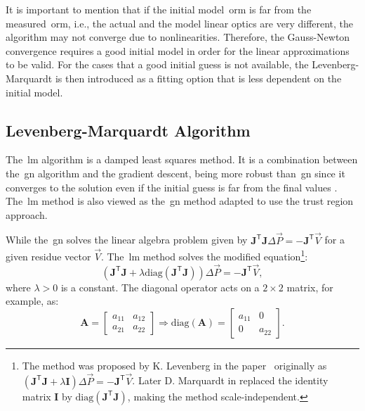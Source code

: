 It is important to mention that if the initial model~\gls{orm} is far from the measured~\gls{orm}, i.e., the actual and the model linear optics are very different, the algorithm may not converge due to nonlinearities. Therefore, the Gauss-Newton convergence requires a good initial model in order for the linear approximations to be valid. For the cases that a good initial guess is not available, the Levenberg-Marquardt is then introduced as a fitting option that is less dependent on the initial model.

\subsection{Levenberg-Marquardt Algorithm}
The~\gls{lm} algorithm is a damped least squares method. It is a combination between the~\gls{gn} algorithm and the gradient descent, being more robust than~\gls{gn} since it converges to the solution even if the initial guess is far from the final values \cite{numerical_recipes}. The~\gls{lm} method is also viewed as the~\gls{gn} method adapted to use the trust region approach.

While the~\gls{gn} solves the linear algebra problem given by $\mathbf{J}^{\mathsf{T}}\mathbf{J}\Delta \vec{P} = - \mathbf{J}^{\mathsf{T}} \vec{V}$ for a given residue vector $\vec{V}$. The~\gls{lm} method solves the modified equation\footnote{The method was proposed by K. Levenberg in the paper~\cite{levenberg} originally as $\left(\mathbf{J}^{\mathsf{T}}\mathbf{J} + \lambda \mathbf{I} \right)\Delta \vec{P} = - \mathbf{J}^{\mathsf{T}}\vec{V}$. Later D. Marquardt in \cite{marquardt} replaced the identity matrix $\mathbf{I}$ by $\mathrm{diag}\left(\mathbf{J}^{\mathsf{T}}\mathbf{J}\right)$, making the method scale-independent.}:
\begin{equation}
    \left(\mathbf{J}^{\mathsf{T}}\mathbf{J} + \lambda \mathrm{diag}\left(\mathbf{J}^{\mathsf{T}}\mathbf{J}\right) \right)\Delta \vec{P} = - \mathbf{J}^{\mathsf{T}}\vec{V},
    \label{eq:lm}
\end{equation}
where $\lambda > 0$ is a constant. The diagonal operator acts on a $2\times 2$ matrix, for example, as:
\begin{equation}
        \mathbf{A} = \begin{bmatrix}
     a_{11} & a_{12} \\
     a_{21} & a_{22} 
\end{bmatrix} \Rightarrow \mathrm{diag}\left(\mathbf{A}\right) = \begin{bmatrix}
     a_{11} & 0 \\
     0 & a_{22}
 \end{bmatrix}.
\end{equation}

